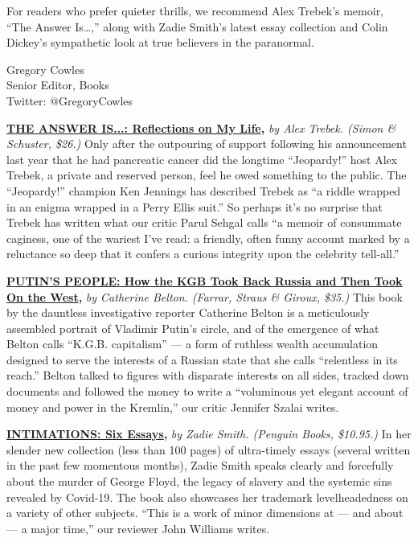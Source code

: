 For readers who prefer quieter thrills, we recommend Alex Trebek's
memoir, ``The Answer Is\ldots{},'' along with Zadie Smith's latest essay
collection and Colin Dickey's sympathetic look at true believers in the
paranormal.

Gregory Cowles\\
Senior Editor, Books\\
Twitter: @GregoryCowles

\href{https://www.nytimes.com/2020/07/21/books/review-answer-is-alex-trebek-jeopardy-memoir.html}{\textbf{THE
ANSWER IS...: Reflections on My Life}}\textbf{,} \emph{by Alex Trebek.
(Simon \& Schuster, \$26.)} Only after the outpouring of support
following his announcement last year that he had pancreatic cancer did
the longtime ``Jeopardy!'' host Alex Trebek, a private and reserved
person, feel he owed something to the public. The ``Jeopardy!'' champion
Ken Jennings has described Trebek as ``a riddle wrapped in an enigma
wrapped in a Perry Ellis suit.'' So perhaps it's no surprise that Trebek
has written what our critic Parul Sehgal calls ``a memoir of consummate
caginess, one of the wariest I've read: a friendly, often funny account
marked by a reluctance so deep that it confers a curious integrity upon
the celebrity tell-all.''

\href{https://www.nytimes.com/2020/07/16/books/review-putins-people-kgb-catherine-belton.html}{\textbf{PUTIN'S
PEOPLE: How the KGB Took Back Russia and Then Took On the
West}}\textbf{,} \emph{by Catherine Belton. (Farrar, Straus \& Giroux,
\$35.)} This book by the dauntless investigative reporter Catherine
Belton is a meticulously assembled portrait of Vladimir Putin's circle,
and of the emergence of what Belton calls ``K.G.B. capitalism'' --- a
form of ruthless wealth accumulation designed to serve the interests of
a Russian state that she calls ``relentless in its reach.'' Belton
talked to figures with disparate interests on all sides, tracked down
documents and followed the money to write a ``voluminous yet elegant
account of money and power in the Kremlin,'' our critic Jennifer Szalai
writes.

\href{https://www.nytimes.com/2020/07/22/books/review-intimations-essays-zadie-smith.html}{\textbf{INTIMATIONS:
Six Essays}}\textbf{,} \emph{by Zadie Smith. (Penguin Books, \$10.95.)}
In her slender new collection (less than 100 pages) of ultra-timely
essays (several written in the past few momentous months), Zadie Smith
speaks clearly and forcefully about the murder of George Floyd, the
legacy of slavery and the systemic sins revealed by Covid-19. The book
also showcases her trademark levelheadedness on a variety of other
subjects. ``This is a work of minor dimensions at --- and about --- a
major time,'' our reviewer John Williams writes.

